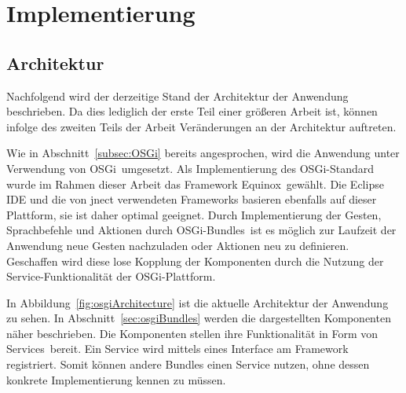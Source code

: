 \chapter{Implementierung}
\label{chap:Implementierung}

\section{Architektur}

Nachfolgend wird der derzeitige Stand der Architektur der Anwendung beschrieben. Da dies lediglich der erste Teil einer gr\"oßeren Arbeit ist, 
k\"onnen infolge des zweiten Teils der Arbeit Ver\"anderungen an der Architektur auftreten. 

Wie in Abschnitt~\ref{subsec:OSGi} bereits angesprochen, wird die Anwendung unter Verwendung von OSGi~\footnotemark[1] umgesetzt. 
Als Implementierung des OSGi-Standard wurde im Rahmen dieser Arbeit das Framework \gls{Equinox}~\footnotemark[2] gew\"ahlt. 
Die Eclipse IDE und die von jnect verwendeten Frameworks basieren ebenfalls auf dieser Plattform, sie ist daher optimal geeignet. 
Durch Implementierung der Gesten, Sprachbefehle und Aktionen durch OSGi-Bundles~\footnotemark[3] ist es m\"oglich zur Laufzeit 
der Anwendung neue Gesten nachzuladen oder Aktionen neu zu definieren. Geschaffen wird diese lose Kopplung der Komponenten durch 
die Nutzung der Service-Funktionalit\"at der OSGi-Plattform.

In Abbildung~\ref{fig:osgiArchitecture} ist die aktuelle Architektur der Anwendung zu sehen. In Abschnitt~\ref{sec:osgiBundles} werden 
die dargestellten Komponenten n\"aher beschrieben. Die Komponenten stellen ihre Funktionalit\"at in Form von Services~\footnotemark[3] bereit. 
Ein Service wird mittels eines Interface am Framework registriert. Somit k\"onnen andere Bundles einen Service nutzen, ohne dessen konkrete 
Implementierung kennen zu m\"ussen.


